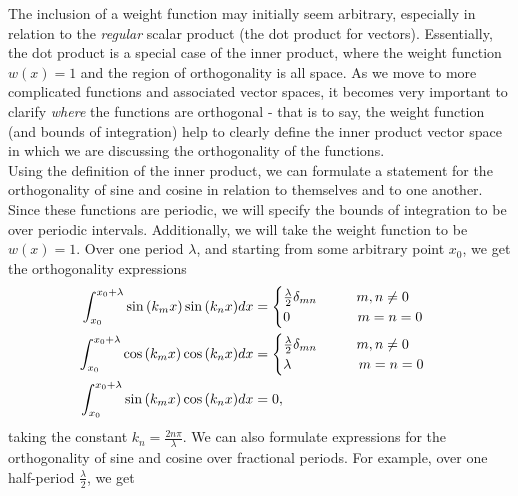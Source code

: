 \documentclass[11pt]{report}
\begin{document}
The inclusion of a weight function may initially seem arbitrary, especially in relation to the \emph{regular} scalar product (the dot product for vectors). Essentially, the dot product is a special case of the inner product, where the weight function $w(x)=1$ and the region of orthogonality is all space. As we move to more complicated functions and associated vector spaces, it becomes very important to clarify \emph{where} the functions are orthogonal - that is to say, the weight function (and bounds of integration) help to clearly define the inner product vector space in which we are discussing the orthogonality of the functions.\\

Using the definition of the inner product, we can formulate a statement for the orthogonality of sine and cosine in relation to themselves and to one another. Since these functions are periodic, we will specify the bounds of integration to be over periodic intervals. Additionally, we will take the weight function to be $w(x)=1$. Over one period $\lambda$, and starting from some arbitrary point $x_0$, we get the orthogonality expressions
    \begin{align}
        \int_{x_0}^{x_0+\lambda}\sin{(k_mx)}\sin{(k_nx)}dx&=\begin{cases}\frac{\lambda}{2}\delta_{mn}\text{\hspace{1cm}$m,n\neq0$}\\0\text{\hspace{1.7cm}$m=n=0$}\end{cases}\\
        \int_{x_0}^{x_0+\lambda}\cos{(k_mx)}\cos{(k_nx)}dx&=\begin{cases}\frac{\lambda}{2}\delta_{mn}\text{\hspace{1cm}$m,n\neq0$}\\\lambda\text{\hspace{1.7cm}$m=n=0$}\end{cases}\\
        \int_{x_0}^{x_0+\lambda}\sin{(k_mx)}\cos{(k_nx)}dx&=0,
    \end{align}
taking the constant $k_n=\frac{2n\pi}{\lambda}$. We can also formulate expressions for the orthogonality of sine and cosine over fractional periods. For example, over one half-period $\frac{\lambda}{2}$, we get
\end{document}
